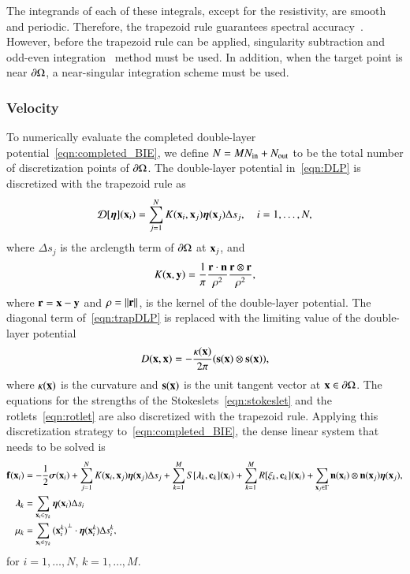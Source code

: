 \documentclass[preprint, 10pt]{elsarticle}
\begin{document}
The integrands of each of these integrals, except for the resistivity,
are smooth and periodic.  Therefore, the trapezoid rule guarantees
spectral accuracy~\cite{tre-wei2014}.  However, before the trapezoid
rule can be applied, singularity subtraction and odd-even
integration~\cite{sid-isr1988} method must be used.  In addition, when
the target point is near ${\partial}\Omega$, a near-singular integration scheme
must be used.


\subsubsection{Velocity}
To numerically evaluate the completed double-layer
potential~\eqref{eqn:completed_BIE}, we define $N = MN_{\mathrm{in}} + N_{\mathrm{out}}$ to
be the total number of discretization points of ${\partial}\Omega$.  The
double-layer potential in~\eqref{eqn:DLP} is discretized with the
trapezoid rule as
\begin{align}
  {\mathcal{D}}[{\boldsymbol\eta}]({\mathbf{x}}_i) = \sum_{j=1}^{N} K({\mathbf{x}}_i,{\mathbf{x}}_j) {\boldsymbol\eta}({\mathbf{x}}_j) 
      \Delta s_{j}, \quad i=1,\ldots,N,
  \label{eqn:trapDLP}
\end{align}
where $\Delta s_j$ is the arclength term of ${\partial}\Omega$ at
${\mathbf{x}}_j$, and
\begin{align*}
  K({\mathbf{x}},{\mathbf{y}}) = \frac{1}{\pi} \frac{{\mathbf{r}} \cdot {\mathbf{n}}}{\rho^2} 
      \frac{{\mathbf{r}} \otimes {\mathbf{r}}}{\rho^2},
\end{align*}
where ${\mathbf{r}} = {\mathbf{x}} - {\mathbf{y}}$ and $\rho = \|{\mathbf{r}}\|$, is the kernel of the
double-layer potential.  The diagonal term of~\eqref{eqn:trapDLP} is
replaced with the limiting value of the double-layer potential
\begin{align*}
  D({\mathbf{x}},{\mathbf{x}}) = -\frac{\kappa({\mathbf{x}})}{2\pi}({\mathbf{s}}({\mathbf{x}}) \otimes {\mathbf{s}}({\mathbf{x}})),
\end{align*}
where $\kappa({\mathbf{x}})$ is the curvature and ${\mathbf{s}}({\mathbf{x}})$ is the unit tangent
vector at ${\mathbf{x}} \in {\partial}\Omega$.  The equations for the strengths of the
Stokeslets~\eqref{eqn:stokeslet} and the rotlets~\eqref{eqn:rotlet} are
also discretized with the trapezoid rule.  Applying this discretization
strategy to~\eqref{eqn:completed_BIE}, the dense linear system that
needs to be solved is
\begin{equation}
  \label{eqn:completed_BIE_discretized}
  \begin{aligned}
    {\mathbf{f}}({\mathbf{x}}_i) &= -\frac{1}{2}{\boldsymbol\sigma}({\mathbf{x}}_i) + \sum_{j=1}^{N} 
      K({\mathbf{x}}_i,{\mathbf{x}}_j) {\boldsymbol\eta}({\mathbf{x}}_j) \Delta s_{j} +
      \sum_{k=1}^M S[{\boldsymbol\lambda}_k,{\mathbf{c}}_k]({\mathbf{x}}_i) +
      \sum_{k=1}^M R[\xi_k,{\mathbf{c}}_k]({\mathbf{x}}_i) + 
      \sum_{{\mathbf{x}}_j \in \Gamma} {\mathbf{n}}({\mathbf{x}}_i) \otimes
      {\mathbf{n}}({\mathbf{x}}_j){\boldsymbol\eta}({\mathbf{x}}_j), \\
    {\boldsymbol\lambda}_k &= \sum_{{\mathbf{x}}_i \in \gamma_k} {\boldsymbol\eta}({\mathbf{x}}_i) 
      \Delta s_i \\ 
    \mu_k &= \sum_{{\mathbf{x}}_i \in \gamma_k}
      {({\mathbf{x}}_i^k)}^\perp \cdot {\boldsymbol\eta}({\mathbf{x}}_i^k) \Delta s_i^k,
  \end{aligned}
\end{equation}
for $i=1,\ldots,N$, $k=1,\ldots,M$.
\end{document}
